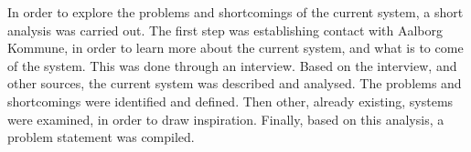 In order to explore the problems and shortcomings of the current \citybike system, a short analysis was carried out.
The first step was establishing contact with Aalborg Kommune, in order to learn more about the current system, and what is to come of the system.
This was done through an interview.
Based on the interview, and other sources, the current system was described and analysed.
The problems and shortcomings were identified and defined.
Then other, already existing, systems were examined, in order to draw inspiration.
Finally, based on this analysis, a problem statement was compiled.
